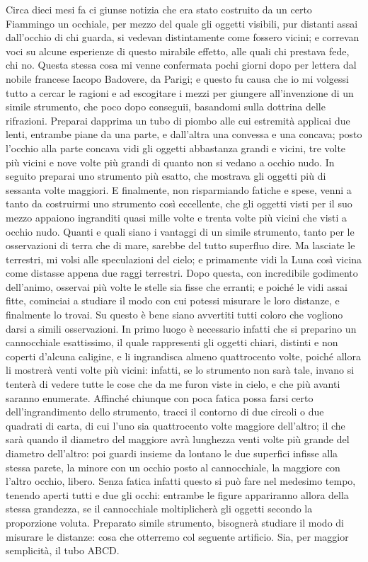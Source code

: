 \documentclass[11pt,twoside,openany]{book}
\begin{document}
Circa dieci mesi fa ci giunse notizia che era stato costruito da un certo Fiammingo un occhiale, per mezzo del quale gli oggetti visibili, pur distanti assai dall'occhio di chi guarda, si vedevan distintamente come fossero vicini; e correvan voci su alcune esperienze di questo mirabile effetto, alle quali chi prestava fede, chi no. Questa stessa cosa mi venne confermata pochi giorni dopo per lettera dal nobile francese Iacopo Badovere, da Parigi; e questo fu causa che io mi volgessi tutto a cercar le ragioni e ad escogitare i mezzi per giungere all'invenzione di un simile strumento, che poco dopo conseguii, basandomi sulla dottrina delle rifrazioni. Preparai dapprima un tubo di piombo alle cui estremità applicai due lenti, entrambe piane da una parte, e dall'altra una convessa e una concava; posto l'occhio alla parte concava vidi gli oggetti abbastanza grandi e vicini, tre volte più vicini e nove volte più grandi di quanto non si vedano a occhio nudo. In seguito preparai uno strumento più esatto, che mostrava gli oggetti più di sessanta volte maggiori. E finalmente, non risparmiando fatiche e spese, venni a tanto da costruirmi uno strumento così eccellente, che gli oggetti visti per il suo mezzo appaiono ingranditi quasi mille volte e trenta volte più vicini che visti a occhio nudo. Quanti e quali siano i vantaggi di un simile strumento, tanto per le osservazioni di terra che di mare, sarebbe del tutto superfluo dire. Ma lasciate le terrestri, mi volsi alle speculazioni del cielo; e primamente vidi la Luna così vicina come distasse appena due raggi terrestri. Dopo questa, con incredibile godimento dell'animo, osservai più volte le stelle sia fisse che erranti; e poiché le vidi assai fitte, cominciai a studiare il modo con cui potessi misurare le loro distanze, e finalmente lo trovai. Su questo è bene siano avvertiti tutti coloro che vogliono darsi a simili osservazioni. In primo luogo è necessario infatti che si preparino un cannocchiale esattissimo, il quale rappresenti gli oggetti chiari, distinti e non coperti d'alcuna caligine, e li ingrandisca almeno quattrocento volte, poiché allora li mostrerà venti volte più vicini: infatti, se lo strumento non sarà tale, invano si tenterà di vedere tutte le cose che da me furon viste in cielo, e che più avanti saranno enumerate. Affinché chiunque con poca fatica possa farsi certo dell'ingrandimento dello strumento, tracci il contorno di due circoli o due quadrati di carta, di cui l'uno sia quattrocento volte maggiore dell'altro; il che sarà quando il diametro del maggiore avrà lunghezza venti volte più grande del diametro dell'altro: poi guardi insieme da lontano le due superfici infisse alla stessa parete, la minore con un occhio posto al cannocchiale, la maggiore con l'altro occhio, libero. Senza fatica infatti questo si può fare nel medesimo tempo, tenendo aperti tutti e due gli occhi: entrambe le figure appariranno allora della stessa grandezza, se il cannocchiale moltiplicherà gli oggetti secondo la proporzione voluta. Preparato simile strumento, bisognerà studiare il modo di misurare le distanze: cosa che otterremo col seguente artificio. Sia, per maggior semplicità, il tubo ABCD.
\end{document}
